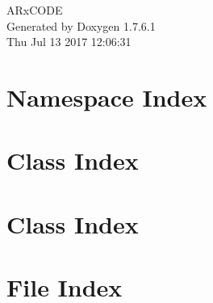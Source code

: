 \documentclass[a4paper]{book}
\begin{document}
\begin{titlepage}
\vspace*{7cm}
\begin{center}
{\Large \-A\-Rx\-C\-O\-D\-E }\\
\vspace*{1cm}
{\large \-Generated by Doxygen 1.7.6.1}\\
\vspace*{0.5cm}
{\small Thu Jul 13 2017 12:06:31}\\
\end{center}
\end{titlepage}
\clearemptydoublepage
{}
\tableofcontents
\clearemptydoublepage
{}
\chapter{\-Namespace \-Index}

\chapter{\-Class \-Index}

\chapter{\-Class \-Index}

\chapter{\-File \-Index}

\end{document}
